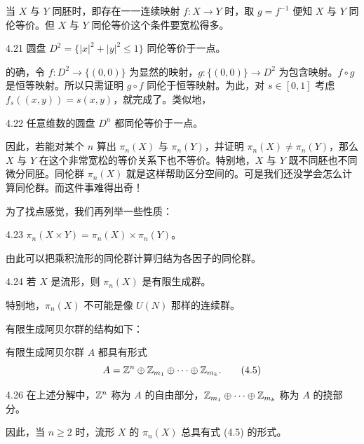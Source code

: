 当 $X$ 与 $Y$ 同胚时，即存在一一连续映射 $f:X\to Y$ 时，取 $g=f^{-1}$ 便知 $X$ 与 $Y$ 同伦等价。但 $X$ 与 $Y$ 同伦等价这个条件要宽松得多。

\begin{example}{4.21}
圆盘 $D^2=\{|x|^2+|y|^2\le1\}$ 同伦等价于一点。
\end{example}

的确，令 $f:D^2\to\{(0,0)\}$ 为显然的映射，$g:\{(0,0)\}\to D^2$ 为包含映射。$f\circ g$ 是恒等映射。所以只需证明 $g\circ f$ 同伦于恒等映射。为此，对 $s\in[0,1]$ 考虑 $f_s((x,y))=s(x,y)$，就完成了。类似地，

\begin{example}{4.22}
任意维数的圆盘 $D^n$ 都同伦等价于一点。
\end{example}

因此，若能对某个 $n$ 算出 $\pi_n(X)$ 与 $\pi_n(Y)$，并证明 $\pi_n(X)\ne\pi_n(Y)$，那么 $X$ 与 $Y$ 在这个非常宽松的等价关系下也不等价。特别地，$X$ 与 $Y$ 既不同胚也不同微分同胚。同伦群 $\pi_n(X)$ 就是这样帮助区分空间的。可是我们还没学会怎么计算同伦群。而这件事难得出奇！

为了找点感觉，我们再列举一些性质：

\begin{proposition}{4.23}
$\pi_n(X\times Y)=\pi_n(X)\times\pi_n(Y)$。
\end{proposition}

由此可以把乘积流形的同伦群计算归结为各因子的同伦群。

\begin{proposition}{4.24}
若 $X$ 是流形，则 $\pi_n(X)$ 是有限生成群。
\end{proposition}

特别地，$\pi_n(X)$ 不可能是像 $U(N)$ 那样的连续群。

有限生成阿贝尔群的结构如下：

\begin{qmbox}
有限生成阿贝尔群 $A$ 都具有形式
\begin{equation}
A=\mathbb{Z}^n\oplus\mathbb{Z}_{m_1}\oplus\cdots\oplus\mathbb{Z}_{m_k}.
\tag{4.5}
\end{equation}
\end{qmbox}

\begin{definition}{4.26}
在上述分解中，$\mathbb{Z}^n$ 称为 $A$ 的自由部分，$\mathbb{Z}_{m_1}\oplus\cdots\oplus\mathbb{Z}_{m_k}$ 称为 $A$ 的挠部分。
\end{definition}

因此，当 $n\ge2$ 时，流形 $X$ 的 $\pi_n(X)$ 总具有式 (4.5) 的形式。

